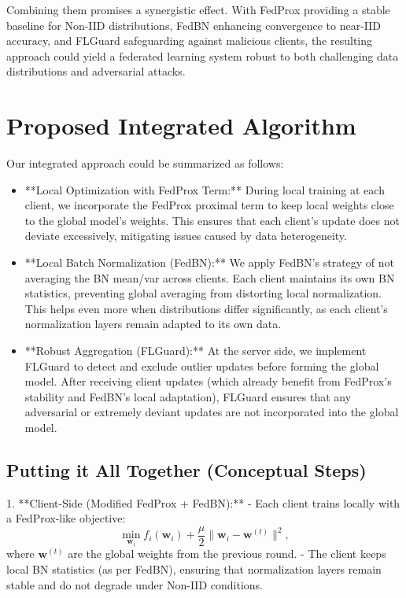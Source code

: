 \documentclass[12pt,a4paper]{report}
\begin{document}
Combining them promises a synergistic effect. With FedProx providing a stable baseline for Non-IID distributions, FedBN enhancing convergence to near-IID accuracy, and FLGuard safeguarding against malicious clients, the resulting approach could yield a federated learning system robust to both challenging data distributions and adversarial attacks.

\section{Proposed Integrated Algorithm}

Our integrated approach could be summarized as follows:
\begin{itemize}
	\item **Local Optimization with FedProx Term:** During local training at each client, we incorporate the FedProx proximal term to keep local weights close to the global model’s weights. This ensures that each client’s update does not deviate excessively, mitigating issues caused by data heterogeneity.
	\item **Local Batch Normalization (FedBN):** We apply FedBN’s strategy of not averaging the BN mean/var across clients. Each client maintains its own BN statistics, preventing global averaging from distorting local normalization. This helps even more when distributions differ significantly, as each client’s normalization layers remain adapted to its own data.
	\item **Robust Aggregation (FLGuard):** At the server side, we implement FLGuard to detect and exclude outlier updates before forming the global model. After receiving client updates (which already benefit from FedProx’s stability and FedBN’s local adaptation), FLGuard ensures that any adversarial or extremely deviant updates are not incorporated into the global model.
\end{itemize}

\subsection{Putting it All Together (Conceptual Steps)}

1. **Client-Side (Modified FedProx + FedBN):**
- Each client trains locally with a FedProx-like objective:
\[
\min_{\mathbf{w}_i} f_i(\mathbf{w}_i) + \frac{\mu}{2}\|\mathbf{w}_i - \mathbf{w}^{(t)}\|^2,
\]
where $\mathbf{w}^{(t)}$ are the global weights from the previous round.
- The client keeps local BN statistics (as per FedBN), ensuring that normalization layers remain stable and do not degrade under Non-IID conditions.
\end{document}
